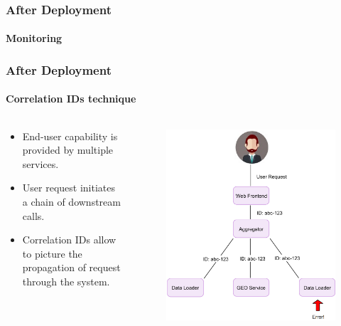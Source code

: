 \documentclass{beamer}
\begin{document}
\begin{frame}
	\frametitle{After Deployment}
	\framesubtitle{Monitoring}
\end{frame}

\begin{frame}
	\frametitle{After Deployment}
	\framesubtitle{Correlation IDs technique}
\begin{columns}
 \begin{column}{.49\textwidth}
	\begin{itemize}
		\item End-user capability is provided by multiple services.
		\item User request initiates a chain of downstream calls.
		\item Correlation IDs allow to picture the propagation of request through the system.
	\end{itemize}
\end{column}
\begin{column}{.49\textwidth}
	\begin{figure}
		\begin{center}
 			\includegraphics[scale=0.5]{correlationIDs}
		\end{center}
	\end{figure}
\end{column}
\end{columns}
\end{frame}
\end{document}
